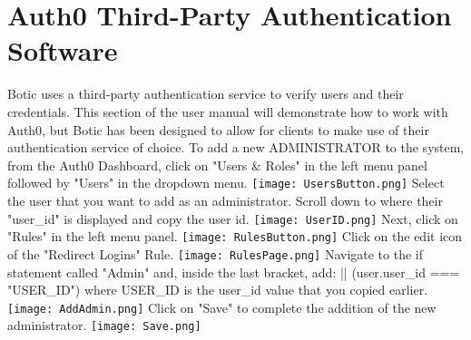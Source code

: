 \documentclass[11pt]{article}
\begin{document}
\section{Auth0 Third-Party Authentication Software}
\begin{flushleft}
	Botic uses a third-party authentication service to verify users and their credentials. This section of the user manual will demonstrate how to work with Auth0, but Botic has been designed to allow for clients to make use of their authentication service of choice.
	To add a new ADMINISTRATOR to the system, from the Auth0 Dashboard, click on "Users & Roles" in the left menu panel followed by "Users" in the dropdown menu.
	\texttt{[image: UsersButton.png]}
	Select the user that you want to add as an administrator. Scroll down to where their "user_id" is displayed and copy the user id.
	\texttt{[image: UserID.png]}
	Next, click on "Rules" in the left menu panel.
	\texttt{[image: RulesButton.png]}
	Click on the edit icon of the "Redirect Logins" Rule.
	\texttt{[image: RulesPage.png]}
	Navigate to the if statement called "Admin" and, inside the last bracket, add:
	 || (user.user_id === "USER_ID")
	where USER_ID is the user_id value that you copied earlier.
	\texttt{[image: AddAdmin.png]}
	Click on "Save" to complete the addition of the new administrator.
	\texttt{[image: Save.png]}


\end{flushleft}
\end{document}
